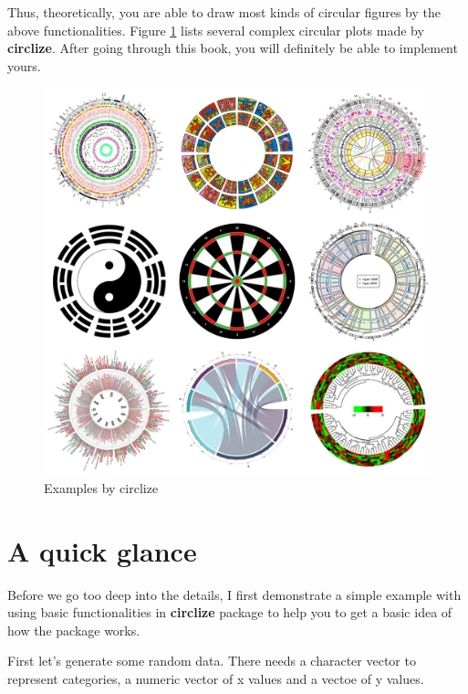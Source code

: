 \documentclass[]{book}
\theoremstyle{definition}
\theoremstyle{definition}
\theoremstyle{remark}
\begin{document}
Thus, theoretically, you are able to draw most kinds of circular figures
by the above functionalities. Figure \ref{fig:circlize-example} lists
several complex circular plots made by \textbf{circlize}. After going
through this book, you will definitely be able to implement yours.

\begin{figure}

{\centering \includegraphics[width=1\linewidth]{images/ciclize_examples} 

}

\caption{Examples by circlize}\label{fig:circlize-example}
\end{figure}

\section{A quick glance}\label{a-qiuck-glance}

Before we go too deep into the details, I first demonstrate a simple
example with using basic functionalities in \textbf{circlize} package to
help you to get a basic idea of how the package works.

First let's generate some random data. There needs a character vector to
represent categories, a numeric vector of x values and a vectoe of y
values.
\end{document}
